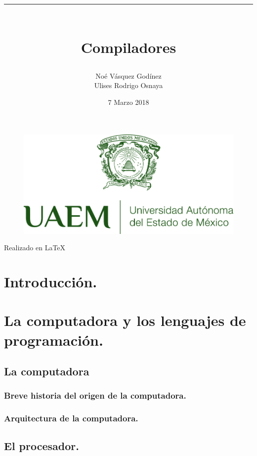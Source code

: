 \documentclass[12pt,letterpaper,openright]{article}
\title{\rule{14cm}{0.1mm}\\ Compiladores \\ }
\author{Noé Vásquez Godínez  \\ Ulises Rodrigo Osnaya   
       \rule{14cm}{0.1mm}
       }
\date{7 Marzo 2018}
\begin{document}
	\begin{titlepage}
		\maketitle
		\begin{figure}[h]
		\includegraphics[scale=2]{logo.jpg}
		\centering
		\end{figure}
		\center Realizado en \LaTeX
\end{titlepage}

\begin{abstract}
\end{abstract}
\newpage
\thispagestyle{empty}
\tableofcontents{}
\newpage
\thispagestyle{empty}
\listoffigures
\newpage
{}
\newpage

\section{Introducción.}
\newpage
\section{La computadora y los lenguajes de programación.}
	\subsection{La computadora}
		\subsubsection{Breve historia del origen de la computadora.}
		\subsubsection{Arquitectura de la computadora.}
	\subsection{El procesador.}
\end{document}
